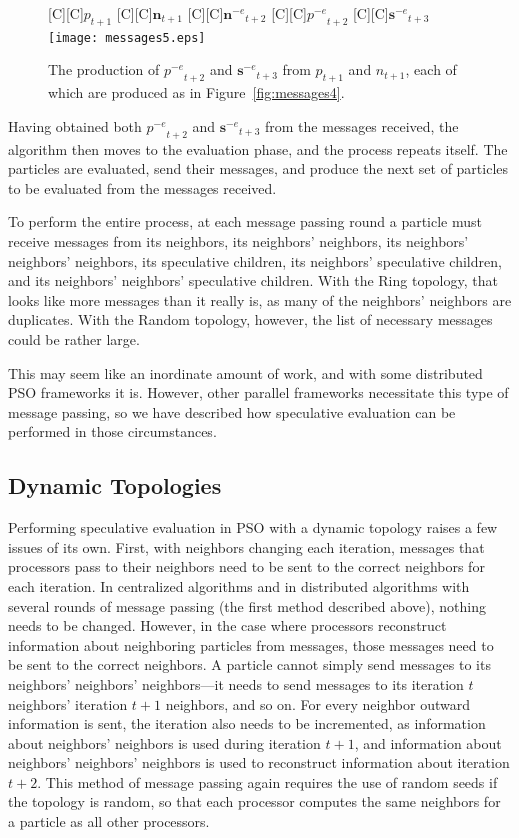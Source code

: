 \documentclass[oneside,honors]{honors}
\newcommand{\fig}[1]{Figure~\ref{fig:#1}}
\providecommand{\noeval}[1]{\ensuremath{#1^{-e}}}
\providecommand{\p}{\ensuremath{p}}
\providecommand{\sset}{\ensuremath{\mathbf{s}}}
\providecommand{\n}{\ensuremath{n}}
\providecommand{\nset}{\ensuremath{\mathbf{n}}}
\begin{document}
\begin{figure}
  \centering
  [C][C]{$\p_{t+1}$}
  [C][C]{$\nset_{t+1}$}
  [C][C]{$\noeval{\nset}_{t+2}$}
  [C][C]{$\noeval{\p}_{t+2}$}
  [C][C]{$\noeval{\sset}_{t+3}$}
  \texttt{[image: messages5.eps]}
  \caption{The production of $\noeval{\p}_{t+2}$ and $\noeval{\sset}_{t+3}$
  from $\p_{t+1}$ and $\n_{t+1}$, each of which are produced as in
  \fig{messages4}.}
  \label{fig:messages5}
\end{figure}

Having obtained both $\noeval{\p}_{t+2}$ and $\noeval{\sset}_{t+3}$ from the
messages received, the algorithm then moves to the evaluation phase, and the
process repeats itself.  The particles are evaluated, send their messages, and
produce the next set of particles to be evaluated from the messages received.

To perform the entire process, at each message passing round a particle must
receive messages from its neighbors, its neighbors' neighbors, its neighbors'
neighbors' neighbors, its speculative children, its neighbors' speculative
children, and its neighbors' neighbors' speculative children.  With the Ring
topology, that looks like more messages than it really is, as many of the
neighbors' neighbors are duplicates.  With the Random topology, however, the
list of necessary messages could be rather large.  

This may seem like an inordinate amount of work, and with some distributed PSO
frameworks it is.  However, other parallel frameworks necessitate this type of
message passing, so we have described how speculative evaluation can be
performed in those circumstances.

\subsection{Dynamic Topologies}

Performing speculative evaluation in PSO with a dynamic topology raises a few
issues of its own.  First, with neighbors changing each iteration, messages
that processors pass to their neighbors need to be sent to the correct
neighbors for each iteration.  In centralized algorithms and in distributed
algorithms with several rounds of message passing (the first method described
above), nothing needs to be changed.  However, in the case where processors
reconstruct information about neighboring particles from messages, those
messages need to be sent to the correct neighbors.  A particle cannot simply
send messages to its neighbors' neighbors' neighbors---it needs to send
messages to its iteration $t$ neighbors' iteration $t+1$ neighbors, and so on.
For every neighbor outward information is sent, the iteration also needs to be
incremented, as information about neighbors' neighbors is used during iteration
$t+1$, and information about neighbors' neighbors' neighbors is used to
reconstruct information about iteration $t+2$.  This method of message passing
again requires the use of random seeds if the topology is random, so that each
processor computes the same neighbors for a particle as all other processors.
\end{document}
